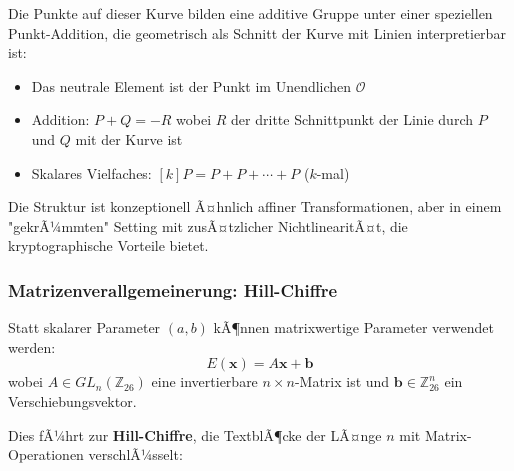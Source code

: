 ﻿\documentclass[12pt,a4paper]{article}
\begin{document}
	Die Punkte auf dieser Kurve bilden eine additive Gruppe unter einer speziellen Punkt-Addition, die geometrisch als Schnitt der Kurve mit Linien interpretierbar ist:
	\begin{itemize}
		\item Das neutrale Element ist der Punkt im Unendlichen $\mathcal{O}$
		\item Addition: $P + Q = -R$ wobei $R$ der dritte Schnittpunkt der Linie durch $P$ und $Q$ mit der Kurve ist
		\item Skalares Vielfaches: $[k]P = P + P + \cdots + P$ ($k$-mal)
	\end{itemize}
	
	Die Struktur ist konzeptionell Ã¤hnlich affiner Transformationen, aber in einem "gekrÃ¼mmten" Setting mit zusÃ¤tzlicher NichtlinearitÃ¤t, die kryptographische Vorteile bietet.
	
	\subsubsection{Matrizenverallgemeinerung: Hill-Chiffre}
	
	Statt skalarer Parameter $(a, b)$ kÃ¶nnen matrixwertige Parameter verwendet werden:
	\begin{equation}
		E(\mathbf{x}) = A\mathbf{x} + \mathbf{b}
	\end{equation}
	wobei $A \in GL_n(\mathbb{Z}_{26})$ eine invertierbare $n \times n$-Matrix ist und $\mathbf{b} \in \mathbb{Z}_{26}^n$ ein Verschiebungsvektor.
	
	Dies fÃ¼hrt zur \textbf{Hill-Chiffre}, die TextblÃ¶cke der LÃ¤nge $n$ mit Matrix-Operationen verschlÃ¼sselt:
	
\end{document}

